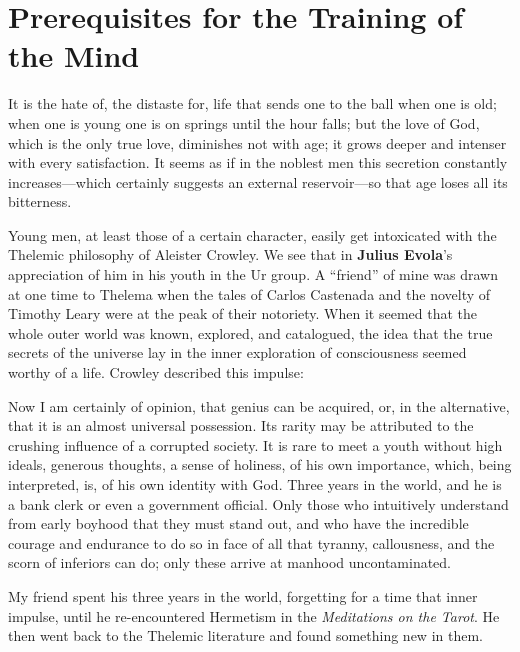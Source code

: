 \section{Prerequisites for the Training of the Mind}

\begin{quotex}
It is the hate of, the distaste for, life that sends one to the ball when one is old; when one is young one is on springs until the hour falls; but the love of God, which is the only true love, diminishes not with age; it grows deeper and intenser with every satisfaction. It seems as if in the noblest men this secretion constantly increases—which certainly suggests an external reservoir—so that age loses all its bitterness. 

\end{quotex}
Young men, at least those of a certain character, easily get intoxicated with the Thelemic philosophy of Aleister Crowley. We see that in \textbf{Julius Evola}'s appreciation of him in his youth in the Ur group. A “friend” of mine was drawn at one time to Thelema when the tales of Carlos Castenada and the novelty of Timothy Leary were at the peak of their notoriety. When it seemed that the whole outer world was known, explored, and catalogued, the idea that the true secrets of the universe lay in the inner exploration of consciousness seemed worthy of a life. Crowley described this impulse:

\begin{quotex}
Now I am certainly of opinion, that genius can be acquired, or, in the alternative, that it is an almost universal possession. Its rarity may be attributed to the crushing influence of a corrupted society. It is rare to meet a youth without high ideals, generous thoughts, a sense of holiness, of his own importance, which, being interpreted, is, of his own identity with God. Three years in the world, and he is a bank clerk or even a government official. Only those who intuitively understand from early boyhood that they must stand out, and who have the incredible courage and endurance to do so in face of all that tyranny, callousness, and the scorn of inferiors can do; only these arrive at manhood uncontaminated. 

\end{quotex}
My friend spent his three years in the world, forgetting for a time that inner impulse, until he re-encountered Hermetism in the \emph{Meditations on the Tarot}. He then went back to the Thelemic literature and found something new in them.

